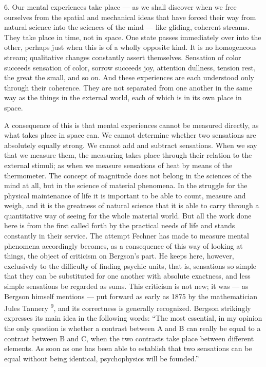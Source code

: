 \documentclass[12pt,a4paper,openany]{book}
\newcommand{\opage}[1]{\marginnote{\footnotesize\textit{[#1]}}}
\newcommand{\nm}[1]{\unskip\textsuperscript{#1}}
\begin{document}
6. Our mental experiences take place --- as we shall discover when we free ourselves from the spatial and mechanical ideas that have forced their way from natural science into the sciences of the mind --- like gliding, coherent streams. They take place in time, not in space. One state passes immediately over into the other, perhaps just when this is of a wholly opposite kind. It is no homogeneous stream; qualitative changes constantly assert themselves. Sensation of color succeeds sensation of color, sorrow succeeds joy, attention dullness, tension rest, the great the small, and so on. And these experiences are each understood only through their coherence. They are not separated from one another in the same way as the things in the external world, each of which is in its own place in space.

A consequence of this is that mental experiences cannot be measured directly, as what takes place in space can. We cannot determine whether two sensations are absolutely equally strong. We cannot add and subtract sensations. When we say that we measure them, the measuring takes place through their relation to the external stimuli; as when we measure sensations of heat by means of the thermometer. The concept of magnitude does not belong in the sciences of the mind at all, but in the science of material phenomena. In the struggle for the physical maintenance of life it is important to be able to count, measure and weigh, and it is the greatness of natural science that it is able to carry through a quantitative way of seeing for the whole material world. But all the work done here is from the first called forth by the practical needs of life and stands constantly in their service.
\opage{14}The attempt Fechner has made to measure mental phenomena accordingly becomes, as a consequence of this way of looking at things, the object of criticism on Bergson's part. He keeps here, however, exclusively to the difficulty of finding psychic units, that is, sensations so simple that they can be substituted for one another with absolute exactness, and less simple sensations be regarded as sums. This criticism is not new; it was --- as Bergson himself mentions --- put forward as early as 1875 by the mathematician Jules Tannery \nm{9}, and its correctness is generally recognized. Bergson strikingly expresses its main idea in the following words: ``The most essential, in my opinion the only question is whether a contrast between A and B can really be equal to a contrast between B and C, when the two contrasts take place between different elements. As soon as one has been able to establish that two sensations can be equal without being identical, psychophysics will be founded.''
\end{document}
